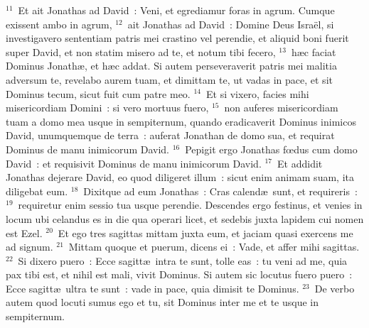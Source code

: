 ${}^{11}$~Et ait Jonathas ad David~: Veni, et egrediamur foras in agrum. Cumque exissent ambo in agrum,
${}^{12}$~ait Jonathas ad David~: Domine Deus Isra\"el, si investigavero sententiam patris mei crastino vel perendie, et aliquid boni fuerit super David, et non statim misero ad te, et notum tibi fecero,
${}^{13}$~h\ae c faciat Dominus Jonath\ae , et h\ae c addat. Si autem perseveraverit patris mei malitia adversum te, revelabo aurem tuam, et dimittam te, ut vadas in pace, et sit Dominus tecum, sicut fuit cum patre meo.
${}^{14}$~Et si vixero, facies mihi misericordiam Domini~: si vero mortuus fuero,
${}^{15}$~non auferes misericordiam tuam a domo mea usque in sempiternum, quando eradicaverit Dominus inimicos David, unumquemque de terra~: auferat Jonathan de domo sua, et requirat Dominus de manu inimicorum David.
${}^{16}$~Pepigit ergo Jonathas fœdus cum domo David~: et requisivit Dominus de manu inimicorum David.
${}^{17}$~Et addidit Jonathas dejerare David, eo quod diligeret illum~: sicut enim animam suam, ita diligebat eum.
${}^{18}$~Dixitque ad eum Jonathas~: Cras calend\ae\ sunt, et requireris~:
${}^{19}$~requiretur enim sessio tua usque perendie. Descendes ergo festinus, et venies in locum ubi celandus es in die qua operari licet, et sedebis juxta lapidem cui nomen est Ezel.
${}^{20}$~Et ego tres sagittas mittam juxta eum, et jaciam quasi exercens me ad signum.
${}^{21}$~Mittam quoque et puerum, dicens ei~: Vade, et affer mihi sagittas.
${}^{22}$~Si dixero puero~: Ecce sagitt\ae\ intra te sunt, tolle eas~: tu veni ad me, quia pax tibi est, et nihil est mali, vivit Dominus. Si autem sic locutus fuero puero~: Ecce sagitt\ae\ ultra te sunt~: vade in pace, quia dimisit te Dominus.
${}^{23}$~De verbo autem quod locuti sumus ego et tu, sit Dominus inter me et te usque in sempiternum.


